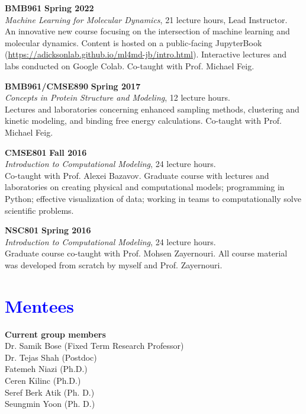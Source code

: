 \documentclass[margin,line]{res}
\begin{document}
\begin{resume}
{\bf BMB961} \hfill {\bf Spring 2022}\\
\emph{Machine Learning for Molecular Dynamics}, 21 lecture hours, Lead Instructor.\\
An innovative new course focusing on the intersection of machine learning and molecular dynamics.  Content is hosted on a public-facing JupyterBook (\url{https://adicksonlab.github.io/ml4md-jb/intro.html}).  Interactive lectures and labs conducted on Google Colab.  Co-taught with Prof. Michael Feig.

{\bf BMB961/CMSE890} \hfill {\bf Spring 2017} \\
\emph{Concepts in Protein Structure and Modeling}, 12 lecture hours.\\
Lectures and laboratories concerning enhanced sampling methods, clustering and kinetic modeling, and binding free energy calculations. Co-taught with Prof. Michael Feig.

{\bf CMSE801} \hfill {\bf Fall 2016} \\
\emph{Introduction to Computational Modeling}, 24 lecture hours.\\
Co-taught with Prof. Alexei Bazavov.
Graduate course with lectures and laboratories on creating physical and computational models; programming in Python; effective visualization of data; working in teams to computationally solve scientific problems.

{\bf NSC801} \hfill {\bf Spring 2016} \\
\emph{Introduction to Computational Modeling}, 24 lecture hours.\\
Graduate course co-taught with Prof. Mohsen Zayernouri.
All course material was developed from scratch by myself and Prof. Zayernouri.

\section{\sc \textcolor{blue}{ Mentees }}

{\bf Current group members}\\
Dr. Samik Bose (Fixed Term Research Professor) \\
Dr. Tejas Shah (Postdoc)\\
Fatemeh Niazi (Ph.D.) \\
Ceren Kilinc (Ph.D.) \\
Seref Berk Atik (Ph. D.) \\
Seungmin Yoon (Ph. D.) \\


\end{resume}
\end{document}
